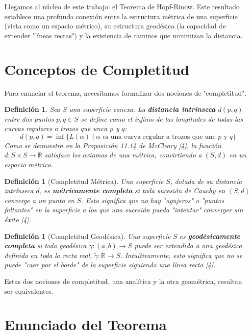 \documentclass[12pt, a4paper]{report}
\theoremstyle{miestilo}
\theoremstyle{midefinicion}
\newtheorem{definicion}[teorema]{Definición}
\begin{document}
Llegamos al núcleo de este trabajo: el Teorema de Hopf-Rinow. Este resultado establece una profunda conexión entre la estructura métrica de una superficie (vista como un espacio métrico), su estructura geodésica (la capacidad de extender "líneas rectas") y la existencia de caminos que minimizan la distancia.

\section{Conceptos de Completitud}

Para enunciar el teorema, necesitamos formalizar dos nociones de "completitud".

\begin{definicion}
Sea $S$ una superficie conexa. La \textbf{distancia intrínseca} $d(p,q)$ entre dos puntos $p, q \in S$ se define como el ínfimo de las longitudes de todas las curvas regulares a trozos que unen $p$ y $q$:
$$ d(p,q) = \inf \{ L(\alpha) \mid \alpha \text{ es una curva regular a trozos que une } p \text{ y } q \} $$
Como se demuestra en la Proposición 11.14 de McCleary [4], la función $d: S \times S \to \mathbb{R}$ satisface los axiomas de una métrica, convirtiendo a $(S,d)$ en un espacio métrico.
\end{definicion}

\begin{definicion}[Completitud Métrica]
Una superficie $S$, dotada de su distancia intrínseca $d$, es \textbf{métricamente completa} si toda sucesión de Cauchy en $(S,d)$ converge a un punto en $S$. Esto significa que no hay "agujeros" o "puntos faltantes" en la superficie a los que una sucesión pueda "intentar" converger sin éxito [4].
\end{definicion}

\begin{definicion}[Completitud Geodésica]
Una superficie $S$ es \textbf{geodésicamente completa} si toda geodésica $\gamma: (a,b) \to S$ puede ser extendida a una geodésica definida en toda la recta real, $\tilde{\gamma}: \mathbb{R} \to S$. Intuitivamente, esto significa que no se puede "caer por el borde" de la superficie siguiendo una línea recta [4].
\end{definicion}

Estas dos nociones de completitud, una analítica y la otra geométrica, resultan ser equivalentes.

\section{Enunciado del Teorema}
\end{document}
